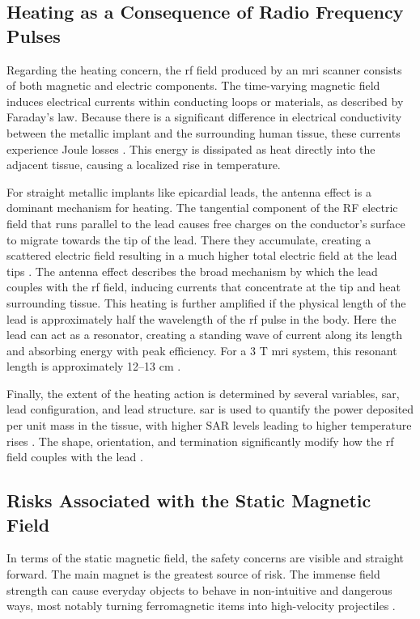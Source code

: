 \subsection{Heating as a Consequence of Radio Frequency Pulses}
\label{sec:rf-heating}
Regarding the heating concern, the \gls{rf} field produced by an \gls{mri} scanner consists of both magnetic and electric components. The time-varying magnetic field induces electrical currents within conducting loops or materials, as described by Faraday's law. Because there is a significant difference in electrical conductivity between the metallic implant and the surrounding human tissue, these currents experience Joule losses \cite{panych2018,aboyewa2021}. This energy is dissipated as heat directly into the adjacent tissue, causing a localized rise in temperature.

For straight metallic implants like epicardial leads, the antenna effect is a dominant mechanism for heating. The tangential component of the RF electric field that runs parallel to the lead causes free charges on the conductor's surface to migrate towards the tip of the lead. There they accumulate, creating a scattered electric field resulting in a much higher total electric field at the lead tips \cite{aboyewa2021,Langman2011}. The antenna effect describes the broad mechanism by which the lead couples with the \gls{rf} field, inducing currents that concentrate at the tip and heat surrounding tissue. This heating is further amplified if the physical length of the lead is approximately half the wavelength of the \gls{rf} pulse in the body. Here the lead can act as a resonator, creating a standing wave of current along its length and absorbing energy with peak efficiency. For a 3 T \gls{mri} system, this resonant length is approximately 12–13 cm \cite{aboyewa2021}.

Finally, the extent of the heating action is determined by several variables, \gls{sar}, lead configuration, and lead structure. \gls{sar} is used to quantify the power deposited per unit mass in the tissue, with higher SAR levels leading to higher temperature rises \cite{panych2018,aboyewa2021}. The shape, orientation, and termination significantly modify how the \gls{rf} field couples with the lead \cite{panych2018,aboyewa2021}.


\subsection{Risks Associated with the Static Magnetic Field}
\label{sec:pull-fields}
In terms of the static magnetic field, the safety concerns are visible and straight forward. The main magnet is the greatest source of risk. The immense field strength can cause everyday objects to behave in non-intuitive and dangerous ways, most notably turning ferromagnetic items into high-velocity projectiles \cite{panych2018}.

